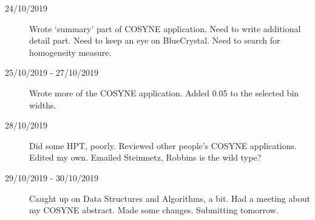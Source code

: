 \documentclass[a4paper,12pt]{article}
\theoremstyle{definition}
\begin{document}
\begin{description}
                                \item[24/10/2019] Wrote `summary' part of COSYNE application. Need to write additional detail part. Need to keep an eye on BlueCrystal. Need to search for homogeneity measure.

                                \item[25/10/2019 - 27/10/2019] Wrote more of the COSYNE application. Added 0.05 to the selected bin widths.

                                \item[28/10/2019] Did some HPT, poorly. Reviewed other people's COSYNE applications. Edited my own. Emailed Steinmetz, Robbins is the wild type?

                                \item[29/10/2019 - 30/10/2019] Caught up on Data Structures and Algorithms, a bit. Had a meeting about my COSYNE abstract. Made some changes. Submitting tomorrow.

  \end{description}
\end{document}
